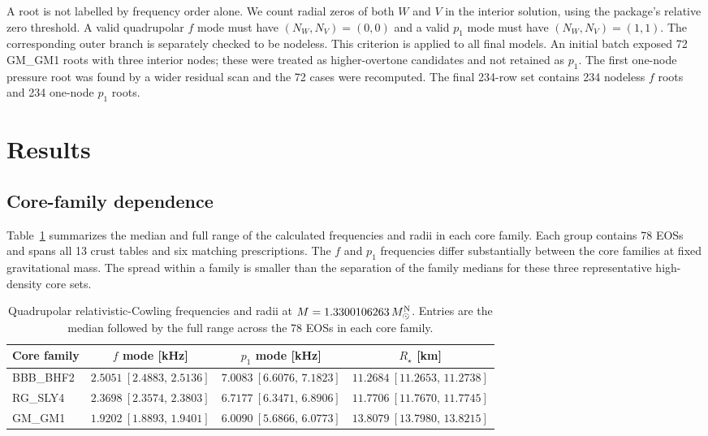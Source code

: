 \documentclass[aps,prd,twocolumn,superscriptaddress,nofootinbib]{revtex4-2}
\newcommand{\MsunN}{M_{\odot}^{\rm N}}
\newcommand{\Rstar}{R_\star}
\begin{document}
A root is not labelled by frequency order alone. We count radial zeros of both $W$ and $V$ in the interior solution, using the package's relative zero threshold. A valid quadrupolar $f$ mode must have $(N_W,N_V)=(0,0)$ and a valid $p_1$ mode must have $(N_W,N_V)=(1,1)$. The corresponding outer branch is separately checked to be nodeless. This criterion is applied to all final models. An initial batch exposed 72 GM\_GM1 roots with three interior nodes; these were treated as higher-overtone candidates and not retained as $p_1$. The first one-node pressure root was found by a wider residual scan and the 72 cases were recomputed. The final 234-row set contains 234 nodeless $f$ roots and 234 one-node $p_1$ roots.

\section{Results}

\subsection{Core-family dependence}

Table~\ref{tab:families} summarizes the median and full range of the calculated frequencies and radii in each core family. Each group contains 78 EOSs and spans all 13 crust tables and six matching prescriptions. The $f$ and $p_1$ frequencies differ substantially between the core families at fixed gravitational mass. The spread within a family is smaller than the separation of the family medians for these three representative high-density core sets.

\begin{table}[t]
\caption{Quadrupolar relativistic-Cowling frequencies and radii at $M=1.3300106263\,\MsunN$. Entries are the median followed by the full range across the 78 EOSs in each core family.}
\label{tab:families}
\begin{ruledtabular}
\begin{tabular}{lccc}
Core family & $f$ mode [kHz] & $p_1$ mode [kHz] & $\Rstar$ [km]\\
\midrule
BBB\_BHF2 & $2.5051\ [2.4883,\,2.5136]$ & $7.0083\ [6.6076,\,7.1823]$ & $11.2684\ [11.2653,\,11.2738]$\\
RG\_SLY4  & $2.3698\ [2.3574,\,2.3803]$ & $6.7177\ [6.3471,\,6.8906]$ & $11.7706\ [11.7670,\,11.7745]$\\
GM\_GM1   & $1.9202\ [1.8893,\,1.9401]$ & $6.0090\ [5.6866,\,6.0773]$ & $13.8079\ [13.7980,\,13.8215]$\\
\end{tabular}
\end{ruledtabular}
\end{table}
\end{document}
